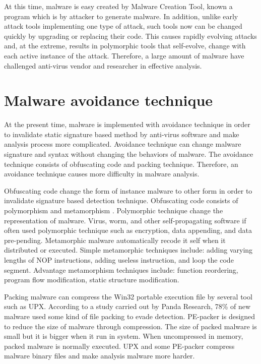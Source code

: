 At this time, malware is easy created by Malware Creation Tool, known a program which is by attacker to generate malware\cite{Microsoft}. In addition, unlike early attack tools implementing one type of attack, such tools now can be changed quickly by upgrading or replacing their code. This causes rapidly evolving attacks and, at the extreme, results in polymorphic tools that self-evolve, change with each active instance of the attack. Therefore, a large amount of malware have challenged anti-virus vendor and researcher in effective analysis.

\section{Malware avoidance technique}

At the present time, malware is implemented with avoidance technique in order to invalidate static signature based method by anti-virus software and make analysis process more complicated. Avoidance technique can change malware signature and syntax without changing the behaviors of malware. The avoidance technique consists of obfuscating code and packing technique. Therefore, an avoidance technique causes more difficulty in malware analysis. 
 
Obfuscating code change the form of instance malware to other form in order to invalidate signature based detection technique. Obfuscating code consists of polymorphism and metamorphism \cite{blackhat1}. Polymorphic technique change the representation of malware. Virus, worm, and other self-propagating software if often used polymorphic technique such as encryption, data appending, and data pre-pending.  Metamorphic malware automatically recode it self when it distributed or executed\cite{blackhat1}. Simple metamorphic techniques include: adding varying lengths of NOP instructions, adding useless instruction, and loop the code segment. Advantage metamorphism techniques include: function reordering, program flow modification, static structure modification.

Packing malware can compress the Win32 portable execution file by several tool such as UPX. According to a study carried out by Panda Research, 78\% of new malware used some kind of file packing to evade detection. PE-packer is designed to reduce the size of malware through compression. The size of packed malware is small but it is bigger when it run in system\cite{packing}. When uncompressed in memory, packed malware is normally executed. UPX and some PE-packer compress malware binary files and make analysis malware more harder.

